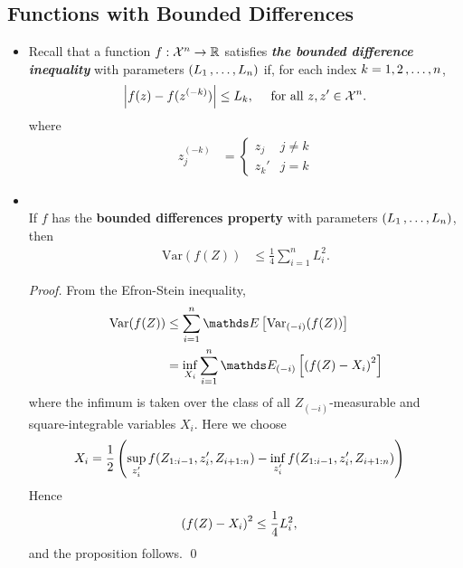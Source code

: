 \documentclass[11pt]{article}
\begin{document}
\subsection{Functions with Bounded Differences}
\begin{itemize}
\item \begin{remark}
Recall that a function $f: {\mathcal X}^n \to {\mathbb R}$ satisfies \textbf{\emph{the bounded difference inequality}} with parameters $(L_1 \,{,}\ldots{,}\, L_n)$ if, for each index $k = 1, 2 \,{,}\ldots{,}\, n$,
\begin{align*}
\left\lvert f(z) - f(z^{(-k)}) \right\rvert \le L_k, \quad\text{ for all }z, z' \in {\mathcal X}^n. 
\end{align*} where 
\begin{align*}
z_j^{(-k)} &= \left\{\begin{array}{cc}
z_j & j \neq k\\
z_k'& j = k
\end{array}
\right.
\end{align*}
\end{remark}

\item \begin{corollary} \citep{boucheron2013concentration}\\
If $f$ has the \textbf{bounded differences property} with parameters $(L_1 \,{,}\ldots{,}\, L_n)$, then
\begin{align*}
\text{Var}(f(Z)) &\le \frac{1}{4}\sum_{i=1}^{n}L_i^2.
\end{align*}
\end{corollary}
\begin{proof}
From the Efron-Stein inequality,
\begin{align*}
\text{Var}(f(Z)) &\le \sum_{i=1}^{n}\E{}{\text{Var}_{(-i)}(f(Z))} \\
&= \inf_{X_i}\sum_{i=1}^{n}\E{(-i)}{\paren{f(Z) - X_i}^2}
\end{align*} where the infimum is taken over the class of all $Z_{(-i)}$-measurable and square-integrable variables $X_i$. Here we choose
\begin{align*}
X_i &= \frac{1}{2}\left(\sup_{z_i'}f(Z_{1:i-1}, z_i', Z_{i+1:n} )   - \inf_{z_i'}f(Z_{1:i-1}, z_i', Z_{i+1:n} ) \right)
\end{align*}
Hence
\begin{align*}
\left(f(Z) - X_i\right)^2 &\le \frac{1}{4} L_i^2,
\end{align*} and the proposition follows. \qed
\end{proof}
\end{itemize}
\end{document}
